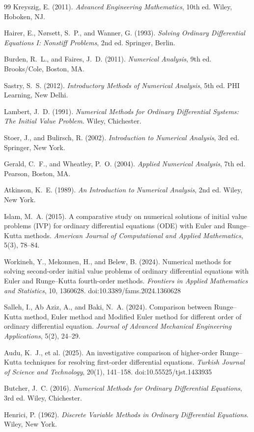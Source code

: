 \documentclass[10pt,letterpaper]{article}
\begin{document}
\begin{thebibliography}{99}
 Kreyszig, E. (2011). \emph{Advanced Engineering Mathematics}, 10th ed. Wiley, Hoboken, NJ.

 Hairer, E., N{\o}rsett, S.~P., and Wanner, G. (1993). \emph{Solving Ordinary Differential Equations I: Nonstiff Problems}, 2nd ed. Springer, Berlin.

 Burden, R.~L., and Faires, J.~D. (2011). \emph{Numerical Analysis}, 9th ed. Brooks/Cole, Boston, MA.

 Sastry, S.~S. (2012). \emph{Introductory Methods of Numerical Analysis}, 5th ed. PHI Learning, New Delhi.

 Lambert, J.~D. (1991). \emph{Numerical Methods for Ordinary Differential Systems: The Initial Value Problem}. Wiley, Chichester.

 Stoer, J., and Bulirsch, R. (2002). \emph{Introduction to Numerical Analysis}, 3rd ed. Springer, New York.

 Gerald, C.~F., and Wheatley, P.~O. (2004). \emph{Applied Numerical Analysis}, 7th ed. Pearson, Boston, MA.

 Atkinson, K.~E. (1989). \emph{An Introduction to Numerical Analysis}, 2nd ed. Wiley, New York.

 Islam, M.~A. (2015). A comparative study on numerical solutions of initial value problems (IVP) for ordinary differential equations (ODE) with Euler and Runge--Kutta methods. \emph{American Journal of Computational and Applied Mathematics}, 5(3), 78--84.

 Workineh, Y., Mekonnen, H., and Belew, B. (2024). Numerical methods for solving second-order initial value problems of ordinary differential equations with Euler and Runge--Kutta fourth-order methods. \emph{Frontiers in Applied Mathematics and Statistics}, 10, 1360628. doi:10.3389/fams.2024.1360628

 Salleh, I., Ab Aziz, A., and Baki, N.~A. (2024). Comparison between Runge--Kutta method, Euler method and Modified Euler method for different order of ordinary differential equation. \emph{Journal of Advanced Mechanical Engineering Applications}, 5(2), 24--29.

 Audu, K.~J., et al. (2025). An investigative comparison of higher-order Runge--Kutta techniques for resolving first-order differential equations. \emph{Turkish Journal of Science and Technology}, 20(1), 141--158. doi:10.55525/tjst.1433935

 Butcher, J.~C. (2016). \emph{Numerical Methods for Ordinary Differential Equations}, 3rd ed. Wiley, Chichester.

 Henrici, P. (1962). \emph{Discrete Variable Methods in Ordinary Differential Equations}. Wiley, New York.
\end{thebibliography}
\end{document}

